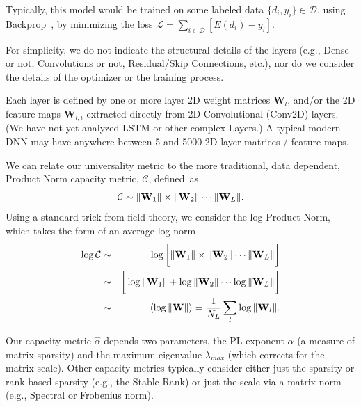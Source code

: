 Typically, this model would be trained on some labeled data $\{d_{i},y_{i}\}\in\mathcal{D}$, using Backprop~\cite{LBOM12_tricks}, by minimizing the loss $\mathcal{L}=\sum_{i\in\mathcal{D}}[E(d_{i})-y_{i}]$.

For simplicity, we do not indicate the structural details of the layers (e.g., Dense or not, Convolutions or not, Residual/Skip Connections, etc.), nor do we consider the details of the optimizer or the training process.

Each layer is defined by one or more layer 2D weight matrices $\mathbf{W}_{l}$, and/or the 2D feature maps $\mathbf{W}_{l,i}$ extracted directly from 2D Convolutional (Conv2D) layers.
(We have not yet analyzed LSTM or other complex Layers.)   A typical modern DNN may have anywhere between 5 and 5000 2D layer matrices / feature maps.

We can relate our universality metric to the more traditional, data dependent, Product Norm capacity metric, $\mathcal{C}$, defined~as
\vspace{-2mm}
\begin{equation}
\mathcal{C}\sim\Vert\mathbf{W}_{1}\Vert\times\Vert\mathbf{W}_{2}\Vert\cdots\Vert\mathbf{W}_{L}\Vert   .
\vspace{-1mm}
\end{equation}
Using a standard trick from field theory, we consider the log Product Norm, which takes the form of an average log norm
\vspace{-2mm}
\begin{eqnarray*}
\log\mathcal{C} &\sim& \log\bigg[\Vert\mathbf{W}_{1}\Vert\times\Vert\mathbf{W}_{2}\Vert\cdots\Vert\mathbf{W}_{L}\Vert\bigg]  \\
                &\sim& \bigg[\log\Vert\mathbf{W}_{1}\Vert+\log\Vert\mathbf{W}_{2}\Vert\cdots\log\Vert\mathbf{W}_{L}\Vert\bigg]  \\
                &\sim&  \langle\log\Vert\mathbf{W}\Vert\rangle=\dfrac{1}{N_{L}}\sum_{l}\log\Vert\mathbf{W}_{l}\Vert   .
\vspace{-1mm}
\end{eqnarray*}

Our capacity metric $\hat{\alpha}$ depends two parameters, the PL exponent $\alpha$ (a measure of matrix sparsity) and the maximum eigenvalue $\lambda_{max}$ (which corrects for the matrix scale). 
Other capacity metrics typically consider either just the sparsity or rank-based sparsity (e.g., the Stable Rank) or just the scale via a matrix norm (e.g., Spectral or Frobenius norm).

